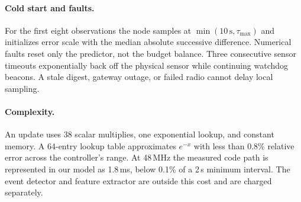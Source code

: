 \paragraph{Cold start and faults.}
For the first eight observations the node samples at
$\min(10\,\mathrm{s},\tau_{\max})$ and initializes error scale with the median
absolute successive difference.  Numerical faults reset only the predictor,
not the budget balance.  Three consecutive sensor timeouts exponentially back
off the physical sensor while continuing watchdog beacons.  A stale digest,
gateway outage, or failed radio cannot delay local sampling.

\paragraph{Complexity.}
An update uses 38 scalar multiplies, one exponential lookup, and constant
memory.  A 64-entry lookup table approximates $e^{-x}$ with less than 0.8\%
relative error across the controller's range.  At 48\,MHz the measured code
path is represented in our model as 1.8\,ms, below 0.1\% of a 2\,s minimum
interval.  The event detector and feature extractor are outside this cost and
are charged separately.

